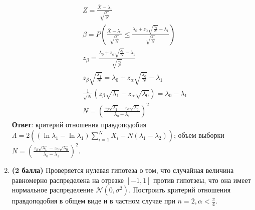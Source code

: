 \documentclass{assignment}
\begin{document}
\begin{enumerate}
\begin{align*}
        &Z = \frac{\bar{X} - \lambda_1}{\sqrt{\frac{\lambda_1}{N}}} \\
        &\beta = P(\frac{\bar{X} - \lambda_1}{\sqrt{\frac{\lambda_1}{N}}} \leq \frac{\lambda_0 + z_{\alpha}\sqrt{\frac{\lambda_0}{N}}-\lambda_1}{\sqrt{\frac{\lambda_1}{N}}}) \\
        &z_{\beta} = \frac{\lambda_0 + z_{\alpha}\sqrt{\frac{\lambda_0}{N}}-\lambda_1}{\sqrt{\frac{\lambda_1}{N}}} \\
        &z_{\beta}\sqrt{\frac{\lambda_1}{N}} = \lambda_0 + z_{\alpha}\sqrt{\frac{\lambda_0}{N}}-\lambda_1 \\
        &\frac{1}{\sqrt{N}}(z_{\beta}\sqrt{\lambda_1} - z_{\alpha}\sqrt{\lambda_0}) = \lambda_0 - \lambda_1 \\
        &N = \left(\frac{z_{\beta}\sqrt{\lambda_1} - z_{\alpha}\sqrt{\lambda_0}}{\lambda_0 - \lambda_1}\right)^2
    \end{align*}
    \textbf{Ответ}: критерий отношения правдоподобия $\Lambda = 2((\ln\lambda_1 - \ln\lambda_1)\sum_{i=1}^{N} X_i - N(\lambda_1 - \lambda_2))$; объем выборки $N = \left(\frac{z_{\beta}\sqrt{\lambda_1} - z_{\alpha}\sqrt{\lambda_0}}{\lambda_0 - \lambda_1}\right)^2$.
    \finish

    \item \textbf{(2 балла)} Проверяется нулевая гипотеза о том, что случайная величина равномерно распределена на отрезке $[-1, 1]$ против гипотзеы, что она имеет нормальное распределение $\mathcal{N}(0, \sigma^2)$. Построить критерий отношения правдоподобия в общем виде и в частном случае при $\displaystyle n = 2, \alpha < \frac{\pi}{4}$.
    


\end{enumerate}
\end{document}
